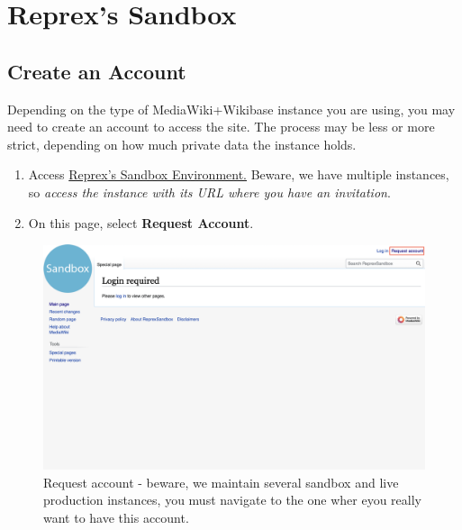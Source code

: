 \documentclass[
  letterpaper,
  DIV=11,
  numbers=noendperiod]{scrreprt}
\begin{document}

\chapter{Reprex's Sandbox}\label{sec-reprex-sandbox}

\section{Create an Account}\label{sec-opencollections-create-account}

Depending on the type of MediaWiki+Wikibase instance you are using, you
may need to create an account to access the site. The process may be
less or more strict, depending on how much private data the instance
holds.

\begin{enumerate}
\def\labelenumi{\arabic{enumi}.}
\item
  Access
  \href{https://reprexbase.eu/sandbox/index.php?title=Main_Page}{Reprex's
  Sandbox Environment.} Beware, we have multiple instances, so
  \emph{access the instance with its URL where you have an invitation}.
\item
  On this page, select \textbf{Request Account}.
\end{enumerate}

\begin{figure}[H]

{\centering \includegraphics{png/wikibase/request-account_1.png}

}

\caption{Request account - beware, we maintain several sandbox and live
production instances, you must navigate to the one wher eyou really want
to have this account.}

\end{figure}%
\end{document}
